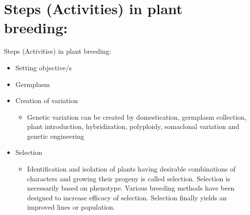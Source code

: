 \documentclass[11pt,ignorenonframetext,aspectratio=169]{beamer}
\providecommand{\tightlist}{%
  \setlength{\itemsep}{0pt}\setlength{\parskip}{0pt}}
\begin{document}
\hypertarget{steps-activities-in-plant-breeding}{%
\section{Steps (Activities) in plant
breeding:}\label{steps-activities-in-plant-breeding}}

\begin{frame}{Steps (Activities) in plant breeding:}
\begin{itemize}
\item
  Setting objective/s
\item
  Germplasm
\item
  Creation of variation

  \begin{itemize}
  \tightlist
  \item
    Genetic variation can be created by domestication, germplasm
    collection, plant introduction, hybridization, polyploidy,
    somaclonal variation and genetic engineering
  \end{itemize}
\item
  Selection

  \begin{itemize}
  \tightlist
  \item
    Identification and isolation of plants having desirable combinations
    of characters and growing their progeny is called selection.
    Selection is necessarily based on phenotype. Various breeding
    methods have been designed to increase efficacy of selection.
    Selection finally yields an improved lines or population.
  \end{itemize}
\end{itemize}
\end{frame}
\end{document}
